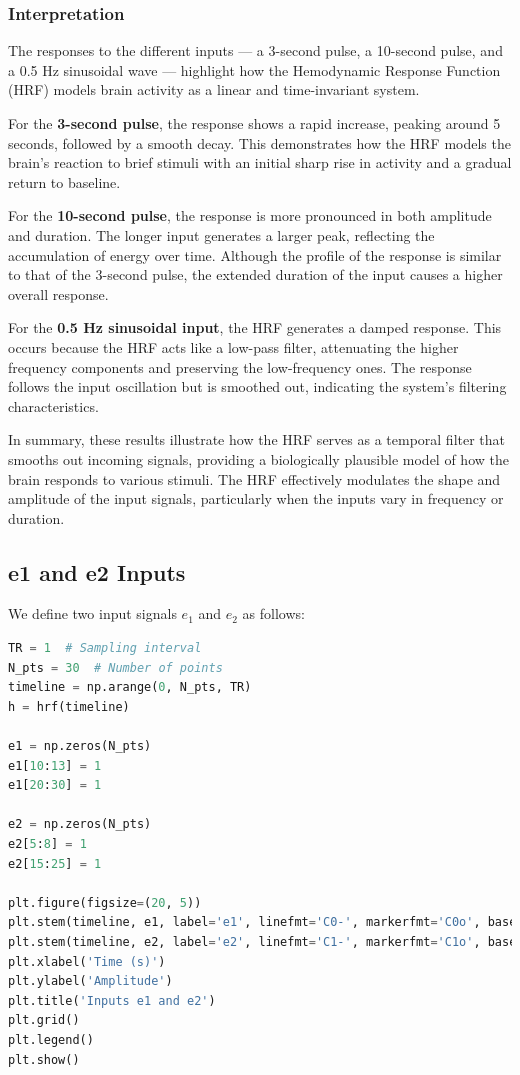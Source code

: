 \documentclass[10pt]{article}
\theoremstyle{definition}
\theoremstyle{remark}
\theoremstyle{definition}
\numberwithin{equation}{prob}
\begin{document}
\subsubsection{Interpretation}

The responses to the different inputs — a 3-second pulse, a 10-second pulse, and a 0.5 Hz sinusoidal wave — highlight how the Hemodynamic Response Function (HRF) models brain activity as a linear and time-invariant system.

For the \textbf{3-second pulse}, the response shows a rapid increase, peaking around 5 seconds, followed by a smooth decay. This demonstrates how the HRF models the brain's reaction to brief stimuli with an initial sharp rise in activity and a gradual return to baseline.

For the \textbf{10-second pulse}, the response is more pronounced in both amplitude and duration. The longer input generates a larger peak, reflecting the accumulation of energy over time. Although the profile of the response is similar to that of the 3-second pulse, the extended duration of the input causes a higher overall response.

For the \textbf{0.5 Hz sinusoidal input}, the HRF generates a damped response. This occurs because the HRF acts like a low-pass filter, attenuating the higher frequency components and preserving the low-frequency ones. The response follows the input oscillation but is smoothed out, indicating the system's filtering characteristics.

In summary, these results illustrate how the HRF serves as a temporal filter that smooths out incoming signals, providing a biologically plausible model of how the brain responds to various stimuli. The HRF effectively modulates the shape and amplitude of the input signals, particularly when the inputs vary in frequency or duration.

\subsection{e1 and e2 Inputs}

We define two input signals $e_1$ and $e_2$ as follows:

\begin{lstlisting}[language=Python]
TR = 1  # Sampling interval
N_pts = 30  # Number of points
timeline = np.arange(0, N_pts, TR)
h = hrf(timeline)

e1 = np.zeros(N_pts)
e1[10:13] = 1
e1[20:30] = 1

e2 = np.zeros(N_pts)
e2[5:8] = 1
e2[15:25] = 1

plt.figure(figsize=(20, 5))
plt.stem(timeline, e1, label='e1', linefmt='C0-', markerfmt='C0o', basefmt='C0-')
plt.stem(timeline, e2, label='e2', linefmt='C1-', markerfmt='C1o', basefmt='C1-')
plt.xlabel('Time (s)')
plt.ylabel('Amplitude')
plt.title('Inputs e1 and e2')
plt.grid()
plt.legend()
plt.show()

\end{lstlisting}
\end{document}
